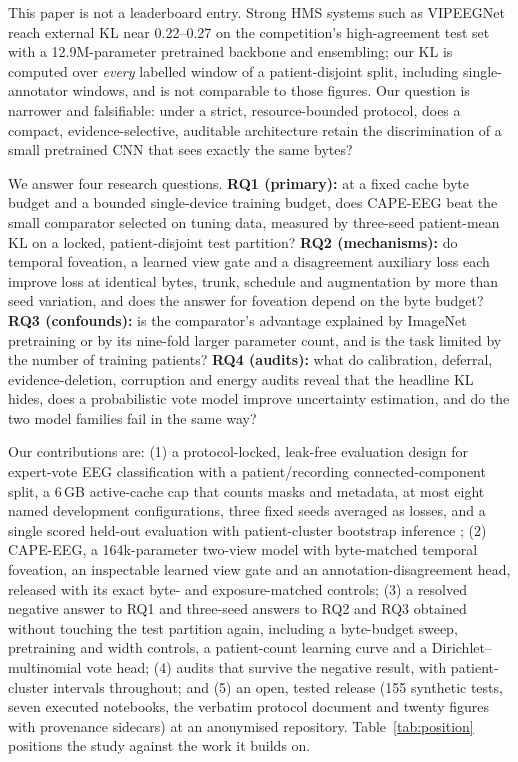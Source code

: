 \documentclass[sigconf,anonymous]{acmart}
\newcommand{\repourl}{an anonymised repository}
\newcommand{\repourl}{\url{https://github.com/Hisernberg/cape-eeg}}
\begin{document}
This paper is not a leaderboard entry. Strong HMS systems such as VIPEEGNet \cite{sun2025vipeegnet} reach external KL near 0.22--0.27 on the competition's high-agreement test set with a 12.9M-parameter pretrained backbone and ensembling; our KL is computed over \emph{every} labelled window of a patient-disjoint split, including single-annotator windows, and is not comparable to those figures. Our question is narrower and falsifiable: under a strict, resource-bounded protocol, does a compact, evidence-selective, auditable architecture retain the discrimination of a small pretrained CNN that sees exactly the same bytes?

We answer four research questions. \textbf{RQ1 (primary):} at a fixed cache byte budget and a bounded single-device training budget, does CAPE-EEG beat the small comparator selected on tuning data, measured by three-seed patient-mean KL on a locked, patient-disjoint test partition? \textbf{RQ2 (mechanisms):} do temporal foveation, a learned view gate and a disagreement auxiliary loss each improve loss at identical bytes, trunk, schedule and augmentation by more than seed variation, and does the answer for foveation depend on the byte budget? \textbf{RQ3 (confounds):} is the comparator's advantage explained by ImageNet pretraining or by its nine-fold larger parameter count, and is the task limited by the number of training patients? \textbf{RQ4 (audits):} what do calibration, deferral, evidence-deletion, corruption and energy audits reveal that the headline KL hides, does a probabilistic vote model improve uncertainty estimation, and do the two model families fail in the same way?

Our contributions are: (1) a protocol-locked, leak-free evaluation design for expert-vote EEG classification with a patient/recording connected-component split, a 6\,GB active-cache cap that counts masks and metadata, at most eight named development configurations, three fixed seeds averaged as losses, and a single scored held-out evaluation with patient-cluster bootstrap inference \cite{nosek2018preregistration,efron1979bootstrap}; (2) CAPE-EEG, a 164k-parameter two-view model with byte-matched temporal foveation, an inspectable learned view gate and an annotation-disagreement head, released with its exact byte- and exposure-matched controls; (3) a resolved negative answer to RQ1 and three-seed answers to RQ2 and RQ3 obtained without touching the test partition again, including a byte-budget sweep, pretraining and width controls, a patient-count learning curve and a Dirichlet--multinomial vote head; (4) audits that survive the negative result, with patient-cluster intervals throughout; and (5) an open, tested release (155 synthetic tests, seven executed notebooks, the verbatim protocol document and twenty figures with provenance sidecars) at \repourl. Table~\ref{tab:position} positions the study against the work it builds on.
\end{document}
